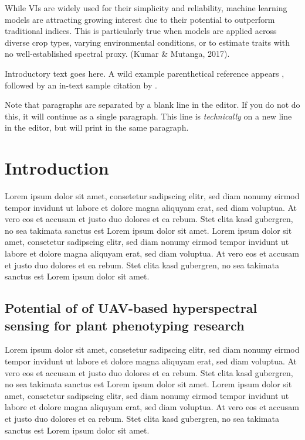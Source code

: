\documentclass[stu,12pt,floatsintext]{apa7}
\begin{document}
While VIs are widely used for their simplicity and reliability, machine learning models are attracting growing interest due to their potential to outperform traditional indices. This is particularly true when models are applied across diverse crop types, varying environmental conditions, or to estimate traits with no well-established spectral proxy. (Kumar & Mutanga, 2017).


Introductory text goes here. A wild example parenthetical reference appears \parencite{Contributor2023}, followed by an in-text sample citation by \textcite{FullBook2021}.

Note that paragraphs are separated by a blank line in the editor. If you do not do this, it will continue as a single paragraph.
This line is \textit{technically} on a new line in the editor, but will print in the same paragraph.

\section{Introduction}

Lorem ipsum dolor sit amet, consetetur sadipscing elitr, sed diam nonumy eirmod tempor invidunt ut labore et dolore magna aliquyam erat, sed diam voluptua. At vero eos et accusam et justo duo dolores et ea rebum. Stet clita kasd gubergren, no sea takimata sanctus est Lorem ipsum dolor sit amet. Lorem ipsum dolor sit amet, consetetur sadipscing elitr, sed diam nonumy eirmod tempor invidunt ut labore et dolore magna aliquyam erat, sed diam voluptua. At vero eos et accusam et justo duo dolores et ea rebum. Stet clita kasd gubergren, no sea takimata sanctus est Lorem ipsum dolor sit amet.

\subsection{Potential of of UAV-based hyperspectral sensing for plant phenotyping research}

Lorem ipsum dolor sit amet, consetetur sadipscing elitr, sed diam nonumy eirmod tempor invidunt ut labore et dolore magna aliquyam erat, sed diam voluptua. At vero eos et accusam et justo duo dolores et ea rebum. Stet clita kasd gubergren, no sea takimata sanctus est Lorem ipsum dolor sit amet. Lorem ipsum dolor sit amet, consetetur sadipscing elitr, sed diam nonumy eirmod tempor invidunt ut labore et dolore magna aliquyam erat, sed diam voluptua. At vero eos et accusam et justo duo dolores et ea rebum. Stet clita kasd gubergren, no sea takimata sanctus est Lorem ipsum dolor sit amet.
\end{document}
